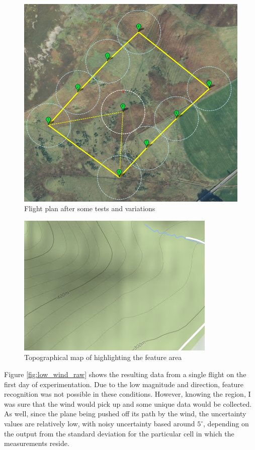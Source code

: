 \documentclass[12pt]{report}
\begin{document}
\begin{figure}[!ht]
	\centering
	\includegraphics[scale=0.35, angle = -40]{flight_plan_3.png}
	\caption{Flight plan after some tests and variations}
	\label{fig:re_flight_plan_1}
\end{figure}

\begin{figure}[!ht]
	\centering
	\includegraphics[scale=0.45, angle=-45]{topographical_mod.png}
	\caption{Topographical map of highlighting the feature area}
	\label{fig:topo}
\end{figure}

Figure \ref{fig:low_wind_raw} shows the resulting data from a single flight on the first day of experimentation. Due to the low magnitude and direction, feature recognition was not possible in these conditions. However, knowing the region, I was sure that the wind would pick up and some unique data would be collected. As well, since the plane being pushed off its path by the wind, the uncertainty values are relatively low, with noisy uncertainty based around $5^\circ$, depending on the output from the standard deviation for the particular cell in which the measurements reside.
\end{document}
